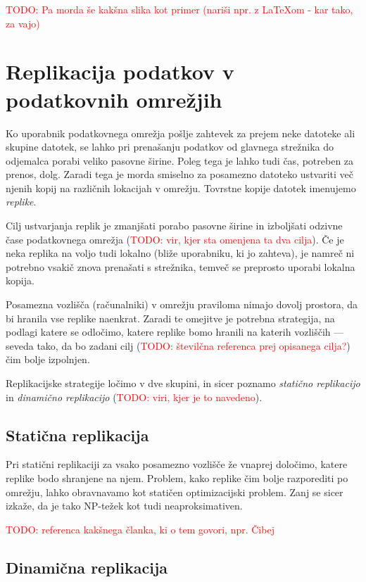 \documentclass[a4paper, 12pt]{book}
\newcommand{\newterm}{\textit}
\newcommand{\TODO}[1]{\textcolor{red}{TODO: #1}}
\begin{document}
\TODO{Pa morda še kakšna slika kot primer (nariši npr. z LaTeXom - kar tako,
 za vajo)}

\section{Replikacija podatkov v podatkovnih omrežjih}

Ko uporabnik podatkovnega omrežja pošlje zahtevek za prejem neke datoteke
ali skupine datotek, se lahko pri prenašanju podatkov od glavnega strežnika
do odjemalca porabi veliko pasovne širine. Poleg tega je lahko tudi čas,
potreben za prenos, dolg. Zaradi tega je morda smiselno za posamezno
datoteko ustvariti več njenih kopij na različnih lokacijah v omrežju.
Tovrstne kopije datotek imenujemo \newterm{replike}.

Cilj ustvarjanja replik je zmanjšati porabo pasovne širine in izboljšati
odzivne čase podatkovnega omrežja (\TODO{vir, kjer sta omenjena ta dva
cilja}). Če je neka replika na voljo tudi lokalno (bliže
uporabniku, ki jo zahteva), je namreč ni potrebno vsakič znova prenašati s
strežnika, temveč se preprosto uporabi lokalna kopija.

Posamezna vozlišča (računalniki) v omrežju praviloma nimajo dovolj prostora,
da bi hranila vse replike naenkrat. Zaradi te omejitve je potrebna
strategija, na podlagi katere se odločimo, katere replike bomo hranili
na katerih vozliščih --- seveda tako, da bo zadani cilj (\TODO{številčna
referenca prej opisanega cilja?}) čim bolje izpolnjen.

Replikacijske strategije ločimo v dve skupini, in sicer poznamo
\newterm{statično replikacijo} in \newterm{dinamično replikacijo}
(\TODO{viri, kjer je to navedeno}).

\subsection{Statična replikacija}

Pri statični replikaciji za vsako posamezno vozlišče že vnaprej določimo,
katere replike bodo shranjene na njem. Problem, kako replike čim bolje
razporediti po omrežju, lahko obravnavamo kot statičen optimizacijski
problem. Zanj se sicer izkaže, da je tako NP-težek kot tudi
neaproksimativen.

\TODO{referenca kakšnega članka, ki o tem govori, npr. Čibej}

\subsection{Dinamična replikacija}
\end{document}
